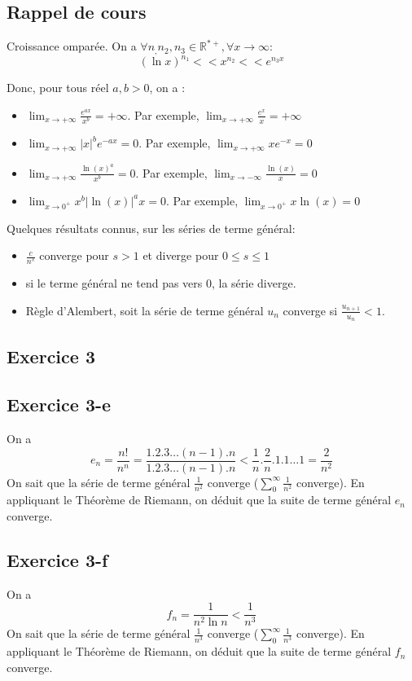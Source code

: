 \documentclass[]{book}
\theoremstyle{definition}
\newcommand{\bb}[1]{\mathbb{#1}}
\newcommand{\R}{\bb{R}}
\begin{document}
\subsection*{Rappel de cours}
Croissance ompar\'ee. On a $\forall n_, n_2, n_3 \in \R^{*+}, \forall x \to \infty$:
$$(\ln x)^{n_1} << x^{n_2} << e^{n_3 x}$$


Donc, pour tous r\'eel $a,b > 0$, on a :
\begin{itemize}
\item $\lim_{x \to +\infty}{\frac{e^{ax}}{x^b}} = +\infty$. Par exemple, $\lim_{x \to +\infty}{\frac{e^x}{x}} = +\infty$  
\item $\lim_{x \to +\infty}{|x|^{b}e^{-ax}} = 0$. Par exemple, $\lim_{x \to +\infty}{xe^{-x}} = 0$  
\item $\lim_{x \to +\infty}{\frac{\ln(x)^a}{x^b}} = 0$. Par exemple, $\lim_{x \to -\infty}{\frac{\ln(x)}{x}} = 0$  
\item $\lim_{x \to 0^{+}}{x^{b}|\ln(x)|^ax} = 0$. Par exemple, $\lim_{x \to 0^{+}}{x\ln(x)} = 0$  
\end{itemize}

Quelques r\'esultats connus, sur les s\'eries de terme g\'en\'eral:
\begin{itemize}
\item  $\frac{c}{n^s}$ converge pour $s > 1$ et diverge pour $0 \leq s \leq 1$
\item si le terme g\'en\'eral ne tend pas vers 0, la s\'erie diverge.
\item R\`egle d'Alembert, soit la s\'erie de terme g\'en\'eral $u_n$ converge si $\frac{u_{n+1}}{u_{n}} < 1$.
\end{itemize}


\newpage
\subsection*{Exercice 3}
\subsection*{Exercice 3-e}
On a 
$$e_n = \frac{n!}{n^n} = \frac{1.2.3 \ldots (n-1).n}{1.2.3 \ldots (n-1).n} < \frac{1}{n}.\frac{2}{n}.1.1\ldots 1 = \frac{2}{n^2}$$
On sait que la s\'erie de terme g\'en\'eral $\frac{1}{n^2}$ converge ($\sum_{0}^{\infty}{\frac{1}{n^2}}$ converge). En appliquant le Th\'eor\`eme de Riemann, on d\'eduit que la suite de terme g\'en\'eral $e_n$ converge.

\subsection*{Exercice 3-f}
On a 
$$f_n = \frac{1}{n^2 \ln n} < \frac{1}{n^3}$$
On sait que la s\'erie de terme g\'en\'eral $\frac{1}{n^3}$ converge ($\sum_{0}^{\infty}{\frac{1}{n^3}}$ converge). En appliquant le Th\'eor\`eme de Riemann, on d\'eduit que la suite de terme g\'en\'eral $f_n$ converge.
\end{document}

